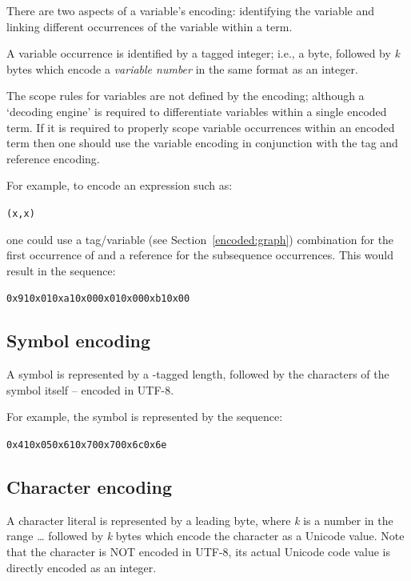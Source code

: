 There are two aspects of a variable's encoding: identifying the variable and linking different occurrences of the variable within a term. 

A variable occurrence is identified by a  tagged integer; i.e., a  byte, followed by \emph{k} bytes which encode a \emph{variable number} in the same format as an integer.

The scope rules for variables are not defined by the encoding; although a `decoding engine' is required to differentiate variables within a single encoded term. If it is required to properly scope variable occurrences within an encoded term then one should use the variable encoding in conjunction with the tag and reference encoding.

For example, to encode an expression such as:
\begin{alltt}
(x,x)
\end{alltt}
one could use a tag/variable (see Section~\vref{encoded:graph}) combination for the first occurrence of  and a reference for the subsequence occurrences. This would result in the sequence:
\begin{alltt}
0x91 0x01 0xa1 0x00 0x01 0x00 0xb1 0x00
\end{alltt}

\subsection{Symbol encoding}
\label{encoded:symbol}

A symbol is represented by a -tagged length, followed by the characters of the symbol itself -- encoded in UTF-8.

For example, the symbol  is represented by the sequence:

\begin{alltt}
0x41 0x05 0x61 0x70 0x70 0x6c 0x6e
\end{alltt}

\subsection{Character encoding}
\label{encoded:char}

A character literal is represented by a leading  byte, where \emph{k} is a number in the range \ldots{} followed by \emph{k} bytes which encode the character as a Unicode value. Note that the character is NOT encoded in UTF-8, its actual Unicode code value is directly encoded as an integer.


